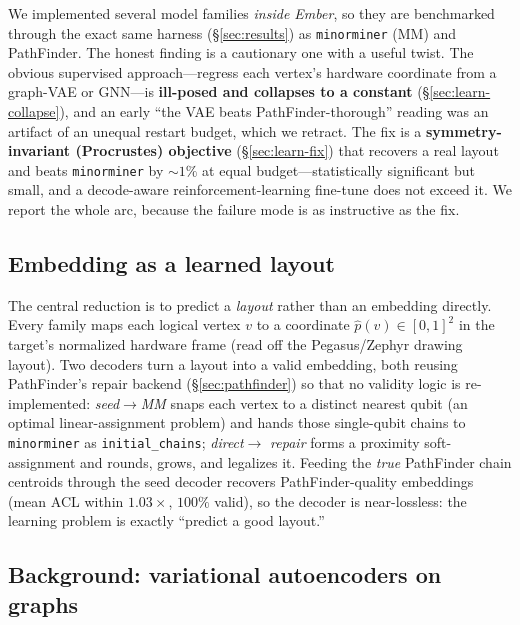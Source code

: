 \documentclass[acmsmall,anonymous,nonacm]{acmart}
\begin{document}
We implemented several model families \emph{inside Ember}, so they are benchmarked
through the exact same harness (\S\ref{sec:results}) as \texttt{minorminer} (MM) and
PathFinder. The honest finding is a cautionary one with a useful twist. The obvious
supervised approach---regress each vertex's hardware coordinate from a graph-VAE or
GNN---is \textbf{ill-posed and collapses to a constant} (\S\ref{sec:learn-collapse}),
and an early ``the VAE beats PathFinder-thorough'' reading was an artifact of an
unequal restart budget, which we retract. The fix is a \textbf{symmetry-invariant
(Procrustes) objective} (\S\ref{sec:learn-fix}) that recovers a real layout and beats
\texttt{minorminer} by ${\sim}1\%$ at equal budget---statistically significant but
small, and a decode-aware reinforcement-learning fine-tune does not exceed it. We
report the whole arc, because the failure mode is as instructive as the fix.

\subsection{Embedding as a learned layout}
\label{sec:learn-layout}

The central reduction is to predict a \emph{layout} rather than an embedding
directly. Every family maps each logical vertex $v$ to a coordinate
$\hat{p}(v)\in[0,1]^2$ in the target's normalized hardware frame (read off the
Pegasus/Zephyr drawing layout). Two decoders turn a layout into a valid embedding,
both reusing PathFinder's repair backend (\S\ref{sec:pathfinder}) so that no
validity logic is re-implemented:
\emph{seed}$\rightarrow$\emph{MM} snaps each vertex to a distinct nearest qubit (an
optimal linear-assignment problem) and hands those single-qubit chains to
\texttt{minorminer} as \texttt{initial\_chains}; \emph{direct}$\rightarrow$%
\emph{repair} forms a proximity soft-assignment and rounds, grows, and legalizes it.
Feeding the \emph{true} PathFinder chain centroids through the seed decoder recovers
PathFinder-quality embeddings (mean ACL within $1.03\times$, $100\%$ valid), so the
decoder is near-lossless: the learning problem is exactly ``predict a good layout.''

\subsection{Background: variational autoencoders on graphs}
\end{document}
